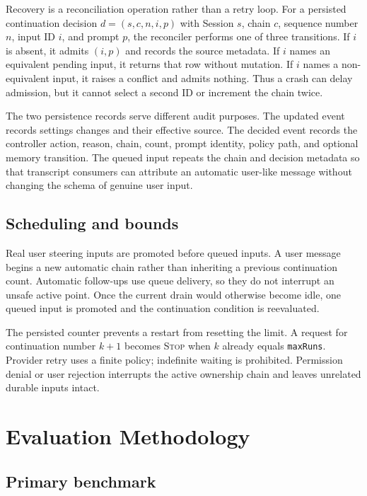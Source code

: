 \documentclass[sigconf,nonacm]{acmart}
\newcommand{\stopaction}{\textsc{Stop}}
\begin{document}
Recovery is a reconciliation operation rather than a retry loop. For a persisted continuation decision $d=(s,c,n,i,p)$ with Session $s$, chain $c$, sequence number $n$, input ID $i$, and prompt $p$, the reconciler performs one of three transitions. If $i$ is absent, it admits $(i,p)$ and records the source metadata. If $i$ names an equivalent pending input, it returns that row without mutation. If $i$ names a non-equivalent input, it raises a conflict and admits nothing. Thus a crash can delay admission, but it cannot select a second ID or increment the chain twice.

The two persistence records serve different audit purposes. The updated event records settings changes and their effective source. The decided event records the controller action, reason, chain, count, prompt identity, policy path, and optional memory transition. The queued input repeats the chain and decision metadata so that transcript consumers can attribute an automatic user-like message without changing the schema of genuine user input.

\subsection{Scheduling and bounds}

Real user steering inputs are promoted before queued inputs. A user message begins a new automatic chain rather than inheriting a previous continuation count. Automatic follow-ups use queue delivery, so they do not interrupt an unsafe active point. Once the current drain would otherwise become idle, one queued input is promoted and the continuation condition is reevaluated.

The persisted counter prevents a restart from resetting the limit. A request for continuation number $k+1$ becomes \stopaction{} when $k$ already equals \texttt{maxRuns}. Provider retry uses a finite policy; indefinite waiting is prohibited. Permission denial or user rejection interrupts the active ownership chain and leaves unrelated durable inputs intact.

\section{Evaluation Methodology}

\subsection{Primary benchmark}
\end{document}
